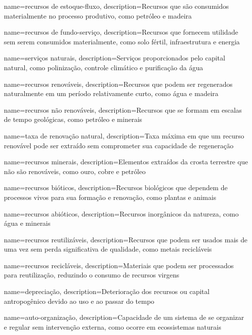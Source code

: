 {
	name=recursos de estoque-fluxo,
	description={Recursos que são consumidos materialmente no processo produtivo, como petróleo e madeira}
}

{
	name=recursos de fundo-serviço,
	description={Recursos que fornecem utilidade sem serem consumidos materialmente, como solo fértil, infraestrutura e energia}
}

{
	name=serviços naturais,
	description={Serviços proporcionados pelo capital natural, como polinização, controle climático e purificação da água}
}

{
	name=recursos renováveis,
	description={Recursos que podem ser regenerados naturalmente em um período relativamente curto, como água e madeira}
}

{
	name=recursos não renováveis,
	description={Recursos que se formam em escalas de tempo geológicas, como petróleo e minerais}
}

{
	name=taxa de renovação natural,
	description={Taxa máxima em que um recurso renovável pode ser extraído sem comprometer sua capacidade de regeneração}
}

{
	name=recursos minerais,
	description={Elementos extraídos da crosta terrestre que não são renováveis, como ouro, cobre e petróleo}
}

{
	name=recursos bióticos,
	description={Recursos biológicos que dependem de processos vivos para sua formação e renovação, como plantas e animais}
}

{
	name=recursos abióticos,
	description={Recursos inorgânicos da natureza, como água e minerais}
}

{
	name=recursos reutilizáveis,
	description={Recursos que podem ser usados mais de uma vez sem perda significativa de qualidade, como metais recicláveis}
}

{
	name=recursos recicláveis,
	description={Materiais que podem ser processados para reutilização, reduzindo o consumo de recursos virgens}
}

{
	name=depreciação,
	description={Deterioração dos recursos ou capital antropogênico devido ao uso e ao passar do tempo}
}

{
	name=auto-organização,
	description={Capacidade de um sistema de se organizar e regular sem intervenção externa, como ocorre em ecossistemas naturais}
}

